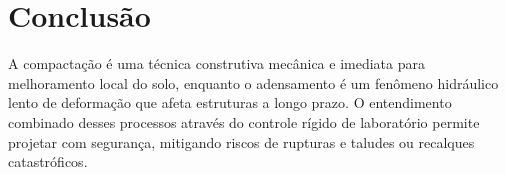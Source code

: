 \chapter{Conclusão}

A compactação é uma técnica construtiva mecânica e imediata para melhoramento local do solo, enquanto o adensamento é um fenômeno hidráulico lento de deformação que afeta estruturas a longo prazo. O entendimento combinado desses processos através do controle rígido de laboratório \cite{nbr7182,mb33336} permite projetar com segurança, mitigando riscos de rupturas e taludes ou recalques catastróficos.